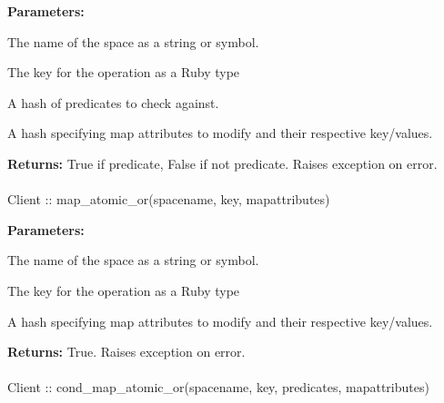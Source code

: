 \noindent\textbf{Parameters:}
\begin{description}[labelindent=\widthof{{\code{mapattributes}}},leftmargin=*,noitemsep,nolistsep,align=right]
\item[\code{spacename}] The name of the space as a string or symbol.
\item[\code{key}] The key for the operation as a Ruby type
\item[\code{predicates}] A hash of predicates to check against.
\item[\code{mapattributes}] A hash specifying map attributes to modify and their respective key/values.
\end{description}

\noindent\textbf{Returns:}
True if predicate, False if not predicate.  Raises exception on error.

\paragraph{}
\label{api:ruby:map_atomic_or}
\begin{rubycode}
Client :: map_atomic_or(spacename, key, mapattributes)
\end{rubycode}


\noindent\textbf{Parameters:}
\begin{description}[labelindent=\widthof{{\code{mapattributes}}},leftmargin=*,noitemsep,nolistsep,align=right]
\item[\code{spacename}] The name of the space as a string or symbol.
\item[\code{key}] The key for the operation as a Ruby type
\item[\code{mapattributes}] A hash specifying map attributes to modify and their respective key/values.
\end{description}

\noindent\textbf{Returns:}
True.  Raises exception on error.

\paragraph{}
\label{api:ruby:cond_map_atomic_or}
\begin{rubycode}
Client :: cond_map_atomic_or(spacename, key, predicates, mapattributes)
\end{rubycode}


